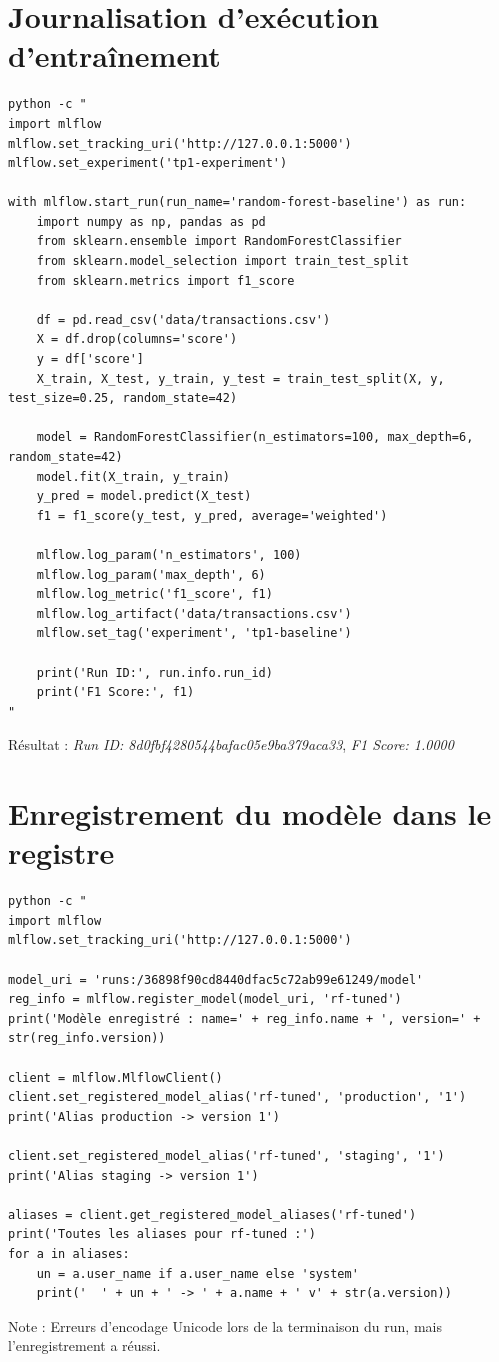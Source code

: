 \documentclass[12pt,a4paper]{report}
\begin{document}
\section{Journalisation d'exécution d'entraînement}
\begin{verbatim}
python -c "
import mlflow
mlflow.set_tracking_uri('http://127.0.0.1:5000')
mlflow.set_experiment('tp1-experiment')

with mlflow.start_run(run_name='random-forest-baseline') as run:
    import numpy as np, pandas as pd
    from sklearn.ensemble import RandomForestClassifier
    from sklearn.model_selection import train_test_split
    from sklearn.metrics import f1_score
    
    df = pd.read_csv('data/transactions.csv')
    X = df.drop(columns='score')
    y = df['score']
    X_train, X_test, y_train, y_test = train_test_split(X, y, test_size=0.25, random_state=42)
    
    model = RandomForestClassifier(n_estimators=100, max_depth=6, random_state=42)
    model.fit(X_train, y_train)
    y_pred = model.predict(X_test)
    f1 = f1_score(y_test, y_pred, average='weighted')
    
    mlflow.log_param('n_estimators', 100)
    mlflow.log_param('max_depth', 6)
    mlflow.log_metric('f1_score', f1)
    mlflow.log_artifact('data/transactions.csv')
    mlflow.set_tag('experiment', 'tp1-baseline')
    
    print('Run ID:', run.info.run_id)
    print('F1 Score:', f1)
"
\end{verbatim}
Résultat : \textit{Run ID: 8d0fbf4280544bafac05e9ba379aca33}, \textit{F1 Score: 1.0000}

\section{Enregistrement du modèle dans le registre}
\begin{verbatim}
python -c "
import mlflow
mlflow.set_tracking_uri('http://127.0.0.1:5000')

model_uri = 'runs:/36898f90cd8440dfac5c72ab99e61249/model'
reg_info = mlflow.register_model(model_uri, 'rf-tuned')
print('Modèle enregistré : name=' + reg_info.name + ', version=' + str(reg_info.version))

client = mlflow.MlflowClient()
client.set_registered_model_alias('rf-tuned', 'production', '1')
print('Alias production -> version 1')

client.set_registered_model_alias('rf-tuned', 'staging', '1')
print('Alias staging -> version 1')

aliases = client.get_registered_model_aliases('rf-tuned')
print('Toutes les aliases pour rf-tuned :')
for a in aliases:
    un = a.user_name if a.user_name else 'system'
    print('  ' + un + ' -> ' + a.name + ' v' + str(a.version))
\end{verbatim}
Note : Erreurs d'encodage Unicode lors de la terminaison du run, mais l'enregistrement a réussi.
\end{document}
